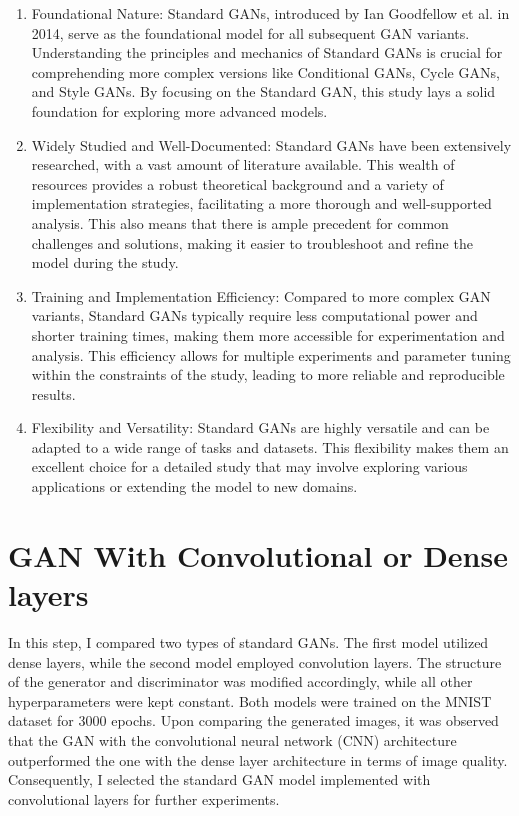 \begin{enumerate}
    \item Foundational Nature: Standard GANs, introduced by Ian Goodfellow et al. in 2014, serve as the 
    foundational model for all subsequent GAN variants. Understanding the principles and mechanics of 
    Standard GANs is crucial for comprehending more complex versions like Conditional GANs, Cycle GANs, 
    and Style GANs. By focusing on the Standard GAN, this study lays a solid foundation for exploring more advanced models.

    \item Widely Studied and Well-Documented: Standard GANs have been extensively researched, with a 
    vast amount of literature available. This wealth of resources provides a robust theoretical 
    background and a variety of implementation strategies, facilitating a more thorough and 
    well-supported analysis. This also means that there is ample precedent for common challenges 
    and solutions, making it easier to troubleshoot and refine the model during the study.

    \item Training and Implementation Efficiency: Compared to more complex GAN variants, 
    Standard GANs typically require less computational power and shorter training times, 
    making them more accessible for experimentation and analysis. This efficiency allows 
    for multiple experiments and parameter tuning within the constraints of the study, 
    leading to more reliable and reproducible results.

    \item Flexibility and Versatility: Standard GANs are highly versatile and can be adapted 
    to a wide range of tasks and datasets. This flexibility makes them an excellent choice for 
    a detailed study that may involve exploring various applications or extending the model to new domains.
\end{enumerate}



\section{GAN With Convolutional or Dense layers}

In this step, I compared two types of standard GANs. The first model utilized dense layers, while the 
second model employed convolution layers. The structure of the generator and discriminator was modified 
accordingly, while all other hyperparameters were kept constant. Both models were trained on the MNIST 
dataset for 3000 epochs. Upon comparing the generated images, it was observed that the GAN with the convolutional 
neural network (CNN) architecture outperformed the one with the dense layer architecture in terms of image quality. 
Consequently, I selected the standard GAN model implemented with convolutional layers for further experiments.

